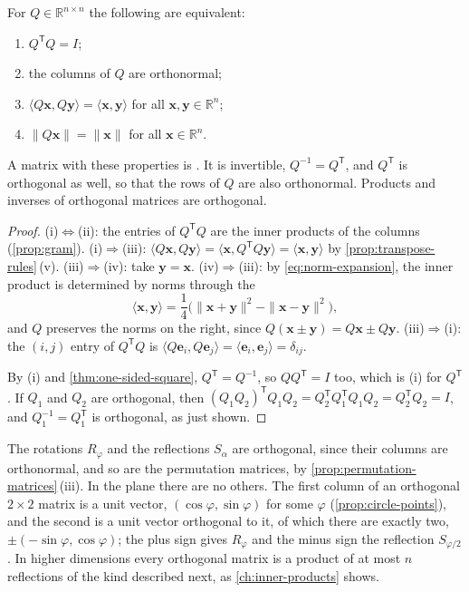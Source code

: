\begin{theorem}
\label{thm:orthogonal}
For $Q\in\mathbb R^{n\times n}$ the following are equivalent:
\begin{enumerate}
\item $Q^{\mathsf T}Q=I$;
\item the columns of $Q$ are orthonormal;
\item $\langle Q\mathbf x,Q\mathbf y\rangle=\langle\mathbf x,\mathbf y\rangle$ for all $\mathbf x,\mathbf y\in\mathbb R^n$;
\item $\|Q\mathbf x\|=\|\mathbf x\|$ for all $\mathbf x\in\mathbb R^n$.
\end{enumerate}
A matrix with these properties is . It is invertible, $Q^{-1}=Q^{\mathsf T}$, and $Q^{\mathsf T}$ is orthogonal as well, so that the rows of $Q$ are also orthonormal. Products and inverses of orthogonal matrices are orthogonal.
\end{theorem}

\begin{proof}
(i)$\Leftrightarrow$(ii): the entries of $Q^{\mathsf T}Q$ are the inner products of the columns (\cref{prop:gram}). (i)$\Rightarrow$(iii): $\langle Q\mathbf x,Q\mathbf y\rangle=\langle\mathbf x,Q^{\mathsf T}Q\mathbf y\rangle=\langle\mathbf x,\mathbf y\rangle$ by \cref{prop:transpose-rules}\,(v). (iii)$\Rightarrow$(iv): take $\mathbf y=\mathbf x$. (iv)$\Rightarrow$(iii): by \eqref{eq:norm-expansion}, the inner product is determined by norms through the 
\[
\langle\mathbf x,\mathbf y\rangle=\frac14\bigl(\|\mathbf x+\mathbf y\|^2-\|\mathbf x-\mathbf y\|^2\bigr),
\]
and $Q$ preserves the norms on the right, since $Q(\mathbf x\pm\mathbf y)=Q\mathbf x\pm Q\mathbf y$. (iii)$\Rightarrow$(i): the $(i,j)$ entry of $Q^{\mathsf T}Q$ is $\langle Q\mathbf e_i,Q\mathbf e_j\rangle=\langle\mathbf e_i,\mathbf e_j\rangle=\delta_{ij}$.

By (i) and \cref{thm:one-sided-square}, $Q^{\mathsf T}=Q^{-1}$, so $QQ^{\mathsf T}=I$ too, which is (i) for $Q^{\mathsf T}$. If $Q_1$ and $Q_2$ are orthogonal, then $(Q_1Q_2)^{\mathsf T}Q_1Q_2=Q_2^{\mathsf T}Q_1^{\mathsf T}Q_1Q_2=Q_2^{\mathsf T}Q_2=I$, and $Q_1^{-1}=Q_1^{\mathsf T}$ is orthogonal, as just shown.
\end{proof}

The rotations $R_\varphi$ and the reflections $S_\alpha$ are orthogonal, since their columns are orthonormal, and so are the permutation matrices, by \cref{prop:permutation-matrices}\,(iii). In the plane there are no others. The first column of an orthogonal $2\times2$ matrix is a unit vector, $(\cos\varphi,\sin\varphi)$ for some $\varphi$ (\cref{prop:circle-points}), and the second is a unit vector orthogonal to it, of which there are exactly two, $\pm(-\sin\varphi,\cos\varphi)$; the plus sign gives $R_\varphi$ and the minus sign the reflection $S_{\varphi/2}$. In higher dimensions every orthogonal matrix is a product of at most $n$ reflections of the kind described next, as \cref{ch:inner-products} shows.

